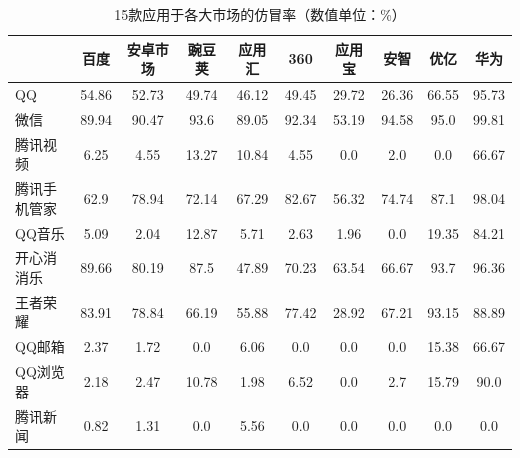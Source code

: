 \begin{table}[htbp]
    \renewcommand{\arraystretch}{1}
    \footnotesize
    \centering
    \caption{15款应用于各大市场的仿冒率（数值单位：\%）}
    \vspace{1mm}
    \begin{tabular}{l c c c c c c c c c}
        \toprule
                                        & {\bf 百度} & {\bf 安卓市场} & {\bf 豌豆荚} & {\bf 应用汇} & {\bf 360} & {\bf 应用宝} & {\bf 安智} & {\bf 优亿} & {\bf 华为} \\
        \midrule
        QQ                              & 54.86      & 52.73          & 49.74        & 46.12        & 49.45     & 29.72        & 26.36      & 66.55      & 95.73      \\
        \rowcolor{gray!15} 微信         & 89.94      & 90.47          & 93.6         & 89.05        & 92.34     & 53.19        & 94.58      & 95.0       & 99.81      \\
        腾讯视频                        & 6.25       & 4.55           & 13.27        & 10.84        & 4.55      & 0.0          & 2.0        & 0.0        & 66.67      \\
        \rowcolor{gray!15} 腾讯手机管家 & 62.9       & 78.94          & 72.14        & 67.29        & 82.67     & 56.32        & 74.74      & 87.1       & 98.04      \\
        QQ音乐                          & 5.09       & 2.04           & 12.87        & 5.71         & 2.63      & 1.96         & 0.0        & 19.35      & 84.21      \\
        \rowcolor{gray!15} 开心消消乐   & 89.66      & 80.19          & 87.5         & 47.89        & 70.23     & 63.54        & 66.67      & 93.7       & 96.36      \\
        王者荣耀                        & 83.91      & 78.84          & 66.19        & 55.88        & 77.42     & 28.92        & 67.21      & 93.15      & 88.89      \\
        \rowcolor{gray!15} QQ邮箱       & 2.37       & 1.72           & 0.0          & 6.06         & 0.0       & 0.0          & 0.0        & 15.38      & 66.67      \\
        QQ浏览器                        & 2.18       & 2.47           & 10.78        & 1.98         & 6.52      & 0.0          & 2.7        & 15.79      & 90.0       \\
        \rowcolor{gray!15} 腾讯新闻     & 0.82       & 1.31           & 0.0          & 5.56         & 0.0       & 0.0          & 0.0        & 0.0        & 0.0        \\

\end{tabular}
\end{table}
